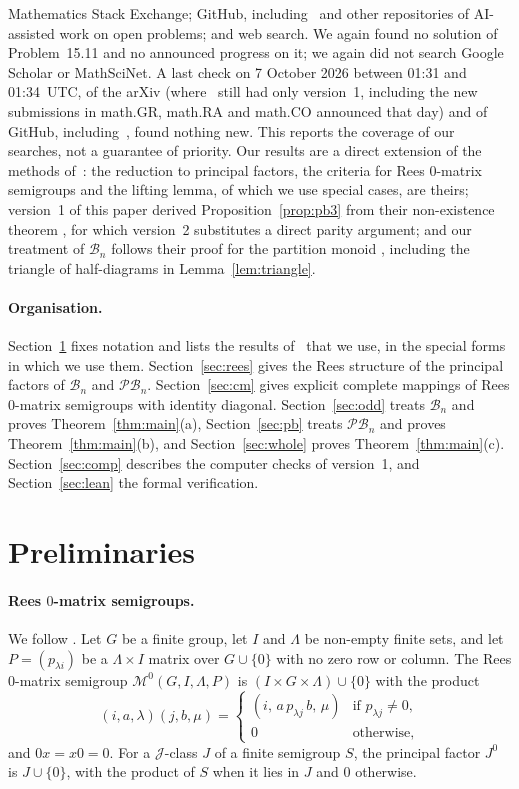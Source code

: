 \documentclass[11pt]{article}
\theoremstyle{remark}
\newcommand{\B}{\mathcal B}
\newcommand{\PB}{\mathcal{PB}}
\newcommand{\M}{\mathcal M}
\begin{document}
Mathematics Stack Exchange; GitHub, including~\cite{trurepo} and other
repositories of AI-assisted work on open problems; and web search. We again
found no solution of Problem~15.11 and no announced progress on it; we again
did not search Google Scholar or MathSciNet. A last check on 7 October 2026
between 01:31 and 01:34~UTC, of the arXiv (where~\cite{abchk} still had only
version~1, including the new submissions in math.GR, math.RA and math.CO
announced that day) and of GitHub, including~\cite{trurepo}, found nothing
new.
This reports the coverage of our searches, not a guarantee of priority. Our
results are a direct extension of the methods of~\cite{abchk}: the reduction to
principal factors, the criteria for Rees $0$-matrix semigroups and the lifting
lemma, of which we use special cases, are theirs; version~1 of this paper
derived Proposition~\ref{prop:pb3} from their non-existence theorem
\cite[Theorem~7.19]{abchk}, for which version~2 substitutes a direct parity
argument; and our treatment of $\B_n$ follows their proof for the partition
monoid \cite[Theorem~8.5]{abchk}, including the triangle of half-diagrams in
Lemma~\ref{lem:triangle}.

\paragraph{Organisation.}
Section~\ref{sec:prelim} fixes notation and lists the results
of~\cite{abchk} that we use, in the special forms in which we use them.
Section~\ref{sec:rees} gives the Rees structure of
the principal factors of $\B_n$ and $\PB_n$. Section~\ref{sec:cm} gives
explicit complete mappings of Rees $0$-matrix semigroups with identity
diagonal. Section~\ref{sec:odd} treats $\B_n$ and proves
Theorem~\ref{thm:main}(a), Section~\ref{sec:pb} treats $\PB_n$ and proves
Theorem~\ref{thm:main}(b), and Section~\ref{sec:whole} proves
Theorem~\ref{thm:main}(c). Section~\ref{sec:comp} describes the computer checks
of version~1, and Section~\ref{sec:lean} the formal verification.

\section{Preliminaries}\label{sec:prelim}

\paragraph{Rees $0$-matrix semigroups.}
We follow \cite[Section~4]{abchk}. Let $G$ be a finite group, let $I$ and
$\Lambda$ be non-empty finite sets, and let $P=(p_{\lambda i})$ be a
$\Lambda\times I$ matrix over $G\cup\{0\}$ with no zero row or column. The
Rees $0$-matrix semigroup $\M^0(G,I,\Lambda,P)$ is $(I\times G\times\Lambda)
\cup\{0\}$ with the product
\[
 (i,a,\lambda)(j,b,\mu)=\begin{cases}(i,\,a\,p_{\lambda j}\,b,\,\mu)&
 \text{if }p_{\lambda j}\ne0,\\ 0&\text{otherwise,}\end{cases}
\]
and $0x=x0=0$. For a $\mathcal J$-class $J$ of a finite
semigroup $S$, the principal factor $J^0$ is $J\cup\{0\}$, with the product of
$S$ when it lies in $J$ and $0$ otherwise.
\end{document}
